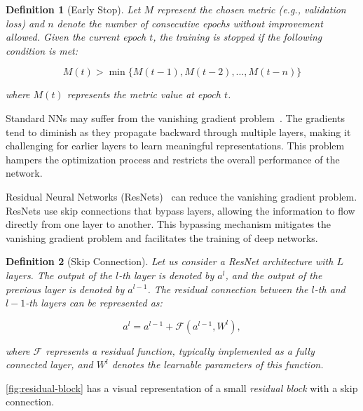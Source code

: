\documentclass[ppgc,diss,english]{iiufrgs}
\newtheorem{definition}{Definition}
\begin{document}
\begin{definition}[Early Stop]
Let $M$ represent the chosen metric (e.g., validation loss) and $n$ denote the number of consecutive epochs without improvement allowed. Given the current epoch $t$, the training is stopped if the following condition is met:

$$M(t) > \min\{M(t-1), M(t-2), \ldots, M(t-n)\}$$

where $M(t)$ represents the metric value at epoch $t$.
\end{definition}


Standard NNs may suffer from the vanishing gradient problem~\cite{Hochreiter/1991}. The gradients tend to diminish as they propagate backward through multiple layers, making it challenging for earlier layers to learn meaningful representations. This problem hampers the optimization process and restricts the overall performance of the network.

Residual Neural Networks (ResNets)~\cite{He.etal/2016} can reduce the vanishing gradient problem. ResNets use skip connections that bypass layers, allowing the information to flow directly from one layer to another. This bypassing mechanism mitigates the vanishing gradient problem and facilitates the training of deep networks.

\begin{definition}[Skip Connection]
Let us consider a ResNet architecture with $L$ layers. The output of the $l$-th layer is denoted by $a^{l}$, and the output of the previous layer is denoted by $a^{l-1}$. The residual connection between the $l$-th and $l-1$-th layers can be represented as:

$$a^{l} = a^{l-1} + \mathcal{F}(a^{l-1}, W^{l}),$$

where $\mathcal{F}$ represents a residual function, typically implemented as a fully connected layer, and $W^{l}$ denotes the learnable parameters of this function.
\end{definition}

\cref{fig:residual-block} has a visual representation of a small \emph{residual block} with a skip connection.
\end{document}
